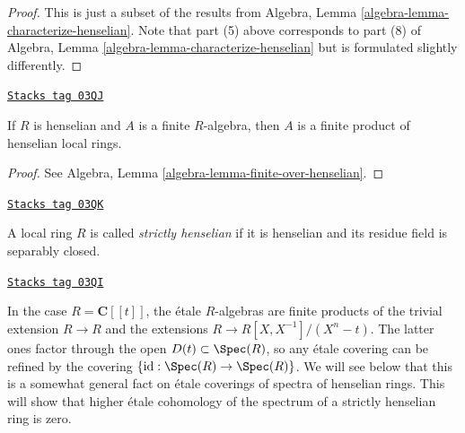 \begin{proof}
This is just a subset of the results from
Algebra, Lemma \ref{algebra-lemma-characterize-henselian}.
Note that part (5) above corresponds to part (8) of
Algebra, Lemma \ref{algebra-lemma-characterize-henselian}
but is formulated slightly differently.
\end{proof}

\begin{lemma}
\label{etale-cohomology-lemma-finite-over-henselian}
\href{https://stacks.math.columbia.edu/tag/03QJ}{\texttt{Stacks tag 03QJ}}

If $R$ is henselian and $A$ is a finite $R$-algebra, then $A$ is a finite
product of henselian local rings.
\end{lemma}

\begin{proof}
See
Algebra, Lemma \ref{algebra-lemma-finite-over-henselian}.
\end{proof}

\begin{definition}
\label{etale-cohomology-definition-strictly-henselian}
\href{https://stacks.math.columbia.edu/tag/03QK}{\texttt{Stacks tag 03QK}}

A local ring $R$ is called {\it strictly henselian} if it is henselian and its
residue field is separably closed.
\end{definition}

\begin{example}[Powerseries]
\label{etale-cohomology-example-powerseries}
\href{https://stacks.math.columbia.edu/tag/03QI}{\texttt{Stacks tag 03QI}}

In the case $R = \mathbf{C}[[t]]$, the \'etale $R$-algebras are finite products
of the trivial extension $R \to R$ and the extensions
$R \to R[X, X^{-1}]/(X^n-t)$.
The latter ones factor through the open $D(t) \subset \Spec(R)$, so any
\'etale covering can be refined by the covering
$\{\text{id} : \Spec(R) \to \Spec(R)\}$. We will see below that
this is a somewhat general fact on \'etale coverings of spectra of henselian
rings. This will show that higher \'etale cohomology of the spectrum of a
strictly henselian ring is zero.
\end{example}

